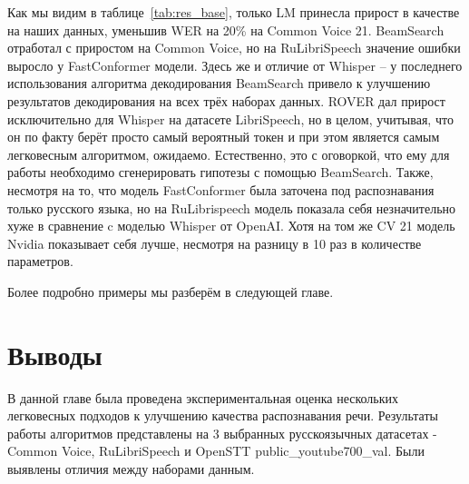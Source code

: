 Как мы видим в таблице~\ref{tab:res_base}, только LM принесла прирост в качестве на наших данных, уменьшив WER на 20\% на Common Voice 21.
BeamSearch отработал с приростом на Common Voice, но на RuLibriSpeech значение ошибки выросло у FastConformer модели.
Здесь же и отличие от Whisper -- у последнего использования алгоритма декодирования BeamSearch привело к улучшению результатов декодирования на всех трёх наборах данных.
ROVER дал прирост исключительно для Whisper на датасете LibriSpeech, но в целом, учитывая, что он по факту берёт просто самый вероятный токен и при этом является самым легковесным алгоритмом, ожидаемо.
Естественно, это с оговоркой, что ему для работы необходимо сгенерировать гипотезы с помощью BeamSearch.
Также, несмотря на то, что модель FastConformer была заточена под распознавания только русского языка, но на RuLibrispeech модель показала себя незначительно хуже в сравнение c моделью Whisper от OpenAI.
Хотя на том же CV 21 модель Nvidia показывает себя лучше, несмотря на разницу в 10 раз в количестве параметров.

Более подробно примеры мы разберём в следующей главе.

\section{Выводы}
В данной главе была проведена экспериментальная оценка нескольких легковесных подходов к улучшению качества распознавания речи.
Результаты работы алгоритмов представлены на 3 выбранных русскоязычных датасетах - Common Voice, RuLibriSpeech и OpenSTT public\_youtube700\_val.
Были выявлены отличия между наборами данным.